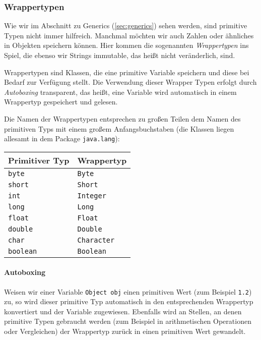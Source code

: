 	\subsubsection{Wrappertypen}
		Wie wir im Abschnitt zu Generics (\ref{sec:generics}) sehen werden, sind primitive Typen nicht immer hilfreich. Manchmal möchten wir auch Zahlen oder ähnliches in Objekten speichern können. Hier kommen die sogenannten \textit{Wrappertypen} ins Spiel, die ebenso wir Strings immutable, das heißt nicht veränderlich, sind.
		
		Wrappertypen sind Klassen, die eine primitive Variable speichern und diese bei Bedarf zur Verfügung stellt. Die Verwendung dieser Wrapper Typen erfolgt durch \textit{Autoboxing} transparent, das heißt, eine Variable wird automatisch in einem Wrappertyp gespeichert und gelesen.
		
		Die Namen der Wrappertypen entsprechen zu großen Teilen dem Namen des primitiven Typs mit einem großem Anfangsbuchstaben (die Klassen liegen allesamt in dem Package \lstinline|java.lang|):
		\begin{table}[H]
			\centering
			\begin{tabular}{l | l}
				\textbf{Primitiver Typ} & \textbf{Wrappertyp}   \\ \hline
				\lstinline|byte|        & \lstinline|Byte|      \\
				\lstinline|short|       & \lstinline|Short|     \\
				\lstinline|int|         & \lstinline|Integer|   \\
				\lstinline|long|        & \lstinline|Long|      \\
				\lstinline|float|       & \lstinline|Float|     \\
				\lstinline|double|      & \lstinline|Double|    \\
				\lstinline|char|        & \lstinline|Character| \\
				\lstinline|boolean|     & \lstinline|Boolean|
			\end{tabular}
		\end{table}
	
		\paragraph{Autoboxing}
			Weisen wir einer Variable \lstinline|Object obj| einen primitiven Wert (zum Beispiel \lstinline|1.2|) zu, so wird dieser primitive Typ automatisch in den entsprechenden Wrappertyp konvertiert und der Variable zugewiesen. Ebenfalls wird an Stellen, an denen primitive Typen gebraucht werden (zum Beispiel in arithmetischen Operationen oder Vergleichen) der Wrappertyp zurück in einen primitiven Wert gewandelt.
			

